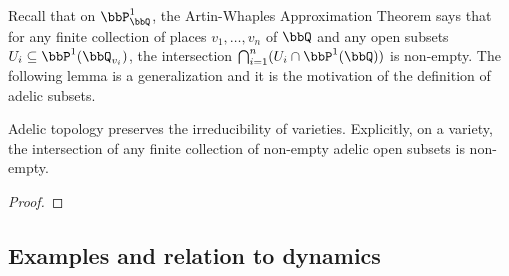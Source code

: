     Recall that on \(\bbP^1_\bbQ\), the Artin-Whaples Approximation Theorem says that for any finite collection of places \(v_1,\ldots,v_n\) of \(\bbQ\) and any open subsets \(U_i \subseteq \bbP^1(\bbQ_{v_i})\),
    the intersection \(\bigcap_{i=1}^n (U_i\cap \bbP^1(\bbQ))\) is non-empty.
    The following lemma is a generalization and it is the motivation of the definition of adelic subsets.

    \begin{theorem}\label{thm:intersection_of_adelic_open_subset}
        Adelic topology preserves the irreducibility of varieties.
        Explicitly, on a variety, the intersection of any finite collection of non-empty adelic open subsets is non-empty.
    \end{theorem}
    \begin{proof}
    \end{proof}




\subsection{Examples and relation to dynamics}




